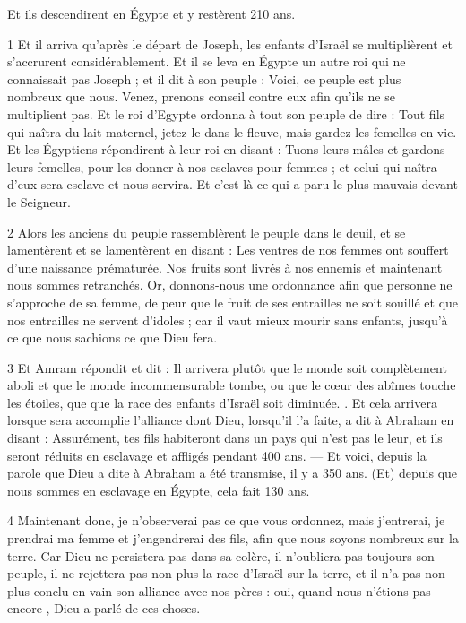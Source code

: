 \par Et ils descendirent en Égypte et y restèrent 210 ans.


\par 1 Et il arriva qu'après le départ de Joseph, les enfants d'Israël se multiplièrent et s'accrurent considérablement. Et il se leva en Égypte un autre roi qui ne connaissait pas Joseph ; et il dit à son peuple : Voici, ce peuple est plus nombreux que nous. Venez, prenons conseil contre eux afin qu'ils ne se multiplient pas. Et le roi d'Egypte ordonna à tout son peuple de dire : Tout fils qui naîtra du lait maternel, jetez-le dans le fleuve, mais gardez les femelles en vie. Et les Égyptiens répondirent à leur roi en disant : Tuons leurs mâles et gardons leurs femelles, pour les donner à nos esclaves pour femmes ; et celui qui naîtra d'eux sera esclave et nous servira. Et c’est là ce qui a paru le plus mauvais devant le Seigneur.

\par 2 Alors les anciens du peuple rassemblèrent le peuple dans le deuil, et se lamentèrent et se lamentèrent en disant : Les ventres de nos femmes ont souffert d'une naissance prématurée. Nos fruits sont livrés à nos ennemis et maintenant nous sommes retranchés. Or, donnons-nous une ordonnance afin que personne ne s'approche de sa femme, de peur que le fruit de ses entrailles ne soit souillé et que nos entrailles ne servent d'idoles ; car il vaut mieux mourir sans enfants, jusqu'à ce que nous sachions ce que Dieu fera.

\par 3 Et Amram répondit et dit : Il arrivera plutôt que le monde soit complètement aboli et que le monde incommensurable tombe, ou que le cœur des abîmes touche les étoiles, que que la race des enfants d'Israël soit diminuée. . Et cela arrivera lorsque sera accomplie l'alliance dont Dieu, lorsqu'il l'a faite, a dit à Abraham en disant : Assurément, tes fils habiteront dans un pays qui n'est pas le leur, et ils seront réduits en esclavage et affligés pendant 400 ans. — Et voici, depuis la parole que Dieu a dite à Abraham a été transmise, il y a 350 ans. (Et) depuis que nous sommes en esclavage en Égypte, cela fait 130 ans.

\par 4 Maintenant donc, je n'observerai pas ce que vous ordonnez, mais j'entrerai, je prendrai ma femme et j'engendrerai des fils, afin que nous soyons nombreux sur la terre. Car Dieu ne persistera pas dans sa colère, il n'oubliera pas toujours son peuple, il ne rejettera pas non plus la race d'Israël sur la terre, et il n'a pas non plus conclu en vain son alliance avec nos pères : oui, quand nous n'étions pas encore , Dieu a parlé de ces choses.

